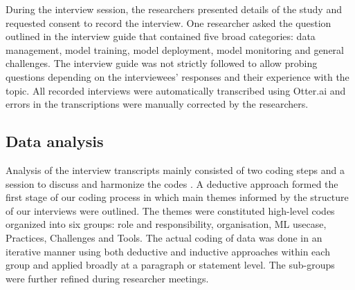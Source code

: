 During the interview session, the researchers presented details of the study and requested consent to record the interview. One researcher asked the question outlined in the interview guide that contained five broad categories: data management, model training, model deployment, model monitoring and general challenges. The interview guide was not strictly followed to allow probing questions depending on the interviewees' responses and their experience with the topic. All recorded interviews were automatically transcribed using Otter.ai and errors in the transcriptions were manually corrected by the researchers.  %



\subsection{Data analysis}
Analysis of the interview transcripts mainly consisted of two coding steps and a session to discuss and harmonize the codes \cite{Runeson2008}. A deductive approach formed the first stage of our coding process in which main themes informed by the structure of our interviews were outlined. %
The themes were constituted high-level codes organized into six groups: role and responsibility, organisation, ML usecase, Practices, Challenges and Tools. The actual coding of data was done in an iterative manner using both deductive and inductive \cite{Runeson2008} approaches within each group and applied broadly at a paragraph or statement level. The sub-groups were further refined during researcher meetings. 
